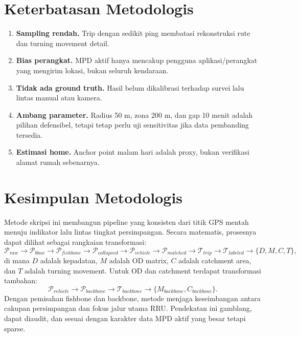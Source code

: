 \documentclass[11pt,a4paper]{article}
\begin{document}
\section{Keterbatasan Metodologis}
\begin{enumerate}
    \item \textbf{Sampling rendah.} Trip dengan sedikit ping membatasi rekonstruksi rute dan turning movement detail.
    \item \textbf{Bias perangkat.} MPD aktif hanya mencakup pengguna aplikasi/perangkat yang mengirim lokasi, bukan seluruh kendaraan.
    \item \textbf{Tidak ada ground truth.} Hasil belum dikalibrasi terhadap survei lalu lintas manual atau kamera.
    \item \textbf{Ambang parameter.} Radius 50 m, zona 200 m, dan gap 10 menit adalah pilihan defensibel, tetapi tetap perlu uji sensitivitas jika data pembanding tersedia.
    \item \textbf{Estimasi home.} Anchor point malam hari adalah proxy, bukan verifikasi alamat rumah sebenarnya.
\end{enumerate}

\section{Kesimpulan Metodologis}
Metode skripsi ini membangun pipeline yang konsisten dari titik GPS mentah menuju indikator lalu lintas tingkat persimpangan. Secara matematis, prosesnya dapat dilihat sebagai rangkaian transformasi:
\[
\mathcal{P}_{raw}\rightarrow \mathcal{P}_{bbox}\rightarrow \mathcal{P}_{fishbone}\rightarrow \mathcal{P}_{collapsed}\rightarrow \mathcal{P}_{vehicle}\rightarrow \mathcal{P}_{matched}\rightarrow \mathcal{T}_{trip}\rightarrow \mathcal{T}_{labeled}\rightarrow \{D,M,C,T\},
\]
di mana $D$ adalah kepadatan, $M$ adalah OD matrix, $C$ adalah catchment area, dan $T$ adalah turning movement. Untuk OD dan catchment terdapat transformasi tambahan:
\[
\mathcal{P}_{vehicle}\rightarrow \mathcal{P}_{backbone}\rightarrow \mathcal{T}_{backbone}\rightarrow \{M_{backbone},C_{backbone}\}.
\]
Dengan pemisahan fishbone dan backbone, metode menjaga keseimbangan antara cakupan persimpangan dan fokus jalur utama RRU. Pendekatan ini gamblang, dapat diaudit, dan sesuai dengan karakter data MPD aktif yang besar tetapi sparse.
\end{document}
